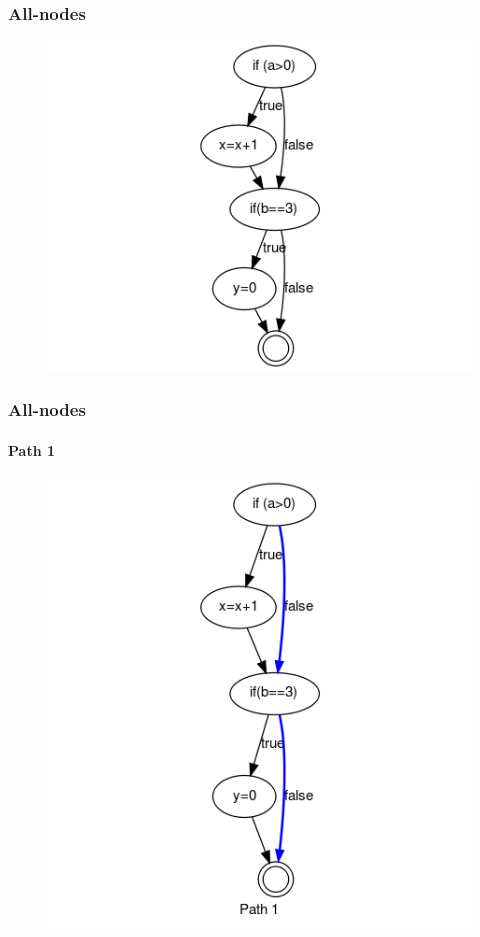 \begin{frame}[c, hasprev=false, hasnext=true]
\label{example:all-nodes}
\frametitle{All-nodes}

\begin{figure}
	\centering
	\includegraphics[scale=.3]{aux/examples/all-nodes/all-nodes-criterion-example}
\end{figure}
\end{frame}


\begin{frame}[c,hasprev=true, hasnext=true]
\frametitle{All-nodes}
\framesubtitle{Path 1}

\begin{figure}
	\centering
	\includegraphics[scale=.3]{aux/examples/all-nodes/all-nodes-criterion-example-path-1}
\end{figure}
\end{frame}



